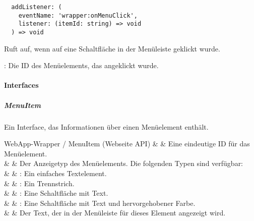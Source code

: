 \begin{verbatim}
  addListener: (
    eventName: 'wrapper:onMenuClick',
    listener: (itemId: string) => void
  ) => void
\end{verbatim}

Ruft  auf, wenn auf eine Schaltfläche in der Menüleiste geklickt wurde.

\begin{arguments}
  \item {}: Die ID des Menüelements, das angeklickt wurde.
\end{arguments}


\newpage

\paragraph{Interfaces}


\subparagraph{MenuItem}

Ein Interface, das Informationen über einen Menüelement enthält.

\begin{interfacedesc}{WebApp-Wrapper / MenuItem (Webseite API)}
     &  & Eine eindeutige ID für das Menüelement. \\ \hline
   &  & Der Anzeigetyp des Menüelements. Die folgenden Typen sind verfügbar: \\
              &                           & \textbf{}: Ein einfaches Textelement. \\
              &                           & \textbf{}: Ein Trennstrich. \\
              &                           & \textbf{}: Eine Schaltfläche mit Text. \\
              &                           & \textbf{}: Eine Schaltfläche mit Text und hervorgehobener Farbe. \\ \hline
   &  & Der Text, der in der Menüleiste für dieses Element angezeigt wird. \\ \hline
\end{interfacedesc}
